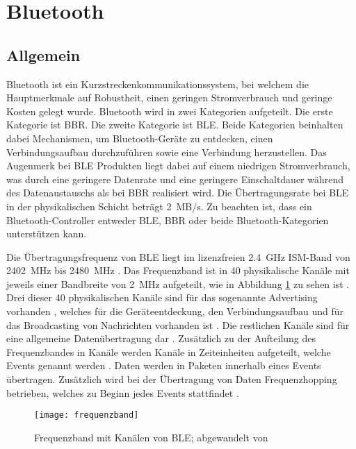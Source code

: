 \section{Bluetooth}

\subsection{Allgemein}

Bluetooth ist ein Kurzstreckenkommunikationssystem, bei welchem die Hauptmerkmale auf Robustheit, einen geringen Stromverbrauch und geringe Kosten gelegt wurde. Bluetooth wird in zwei Kategorien aufgeteilt. Die erste Kategorie ist \ac{BBR}. Die zweite Kategorie ist \ac{BLE}. Beide Kategorien beinhalten dabei Mechanismen, um Bluetooth-Geräte zu entdecken, einen Verbindungsaufbau durchzuführen sowie eine Verbindung herzustellen. Das Augenmerk bei \ac{BLE} Produkten liegt dabei auf einem niedrigen Stromverbrauch, was durch eine geringere Datenrate und eine geringere Einschaltdauer während des Datenaustauschs als bei \ac{BBR} realisiert wird. Die Übertragungsrate bei \ac{BLE} in der physikalischen Schicht beträgt 2~MB/s. Zu beachten ist, dass ein Bluetooth-Controller entweder \ac{BLE}, \ac{BBR} oder beide Bluetooth-Kategorien unterstützen kann. \cite[S.~187]{bluetoothCore}

Die Übertragungsfrequenz von \ac{BLE} liegt im lizenzfreien 2.4~GHz \acf{ISM}-Band von 2402~MHz bis 2480~MHz \cites[S.~4]{siliconBLE}[S.~190]{bluetoothCore}. Das Frequenzband ist in 40 physikalische Kanäle mit jeweils einer Bandbreite von 2~MHz aufgeteilt, wie in Abbildung \ref{fig:frequenzbandBLE} zu sehen ist \cite[S.~190]{bluetoothCore}. Drei dieser 40 physikalischen Kanäle sind für das sogenannte Advertising vorhanden \cite[S.~190]{bluetoothCore}, welches für die Geräteentdeckung, den Verbindungsaufbau und für das Broadcasting von Nachrichten vorhanden ist \cite[S.~4]{siliconBLE}. Die restlichen Kanäle sind für eine allgemeine Datenübertragung dar \cite[S.~190]{bluetoothCore}. Zusätzlich zu der Aufteilung des Frequenzbandes in Kanäle werden Kanäle in Zeiteinheiten aufgeteilt, welche Events genannt werden \cite[S.~190]{bluetoothCore}. Daten werden in Paketen innerhalb eines Events übertragen. Zusätzlich wird bei der Übertragung von Daten Frequenzhopping betrieben, welches zu Beginn jedes Events stattfindet \cite[S.~190f.]{bluetoothCore}. 

\begin{figure}[h]
\centering
\texttt{[image: frequenzband]}
\caption{Frequenzband mit Kanälen von \ac{BLE}; abgewandelt von \cite[S.~4]{siliconBLE}}
\label{fig:frequenzbandBLE}
\end{figure}

